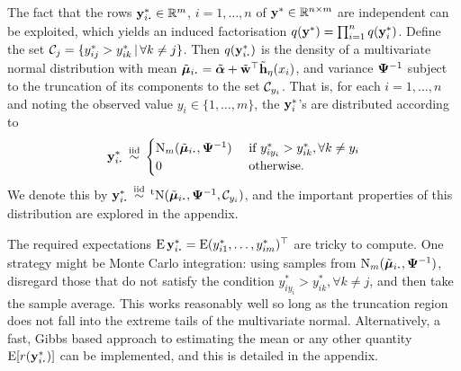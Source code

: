 The fact that the rows $\by_{i \bigcdot}^* \in \bbR^m$, $i=1,\dots,n$ of ${\mathbf y}^* \in \mathbb{R}^{n \times m}$ are independent can be exploited, which yields an induced factorisation $q({\mathbf y}^*) = \prod_{i=1}^n q({\mathbf y}_i^*)$.
Define the set ${\mathcal C}_j = \{y_{ij}^* > y_{ik}^* \,|\, \forall k\neq j \}$.
Then $q(\by_{i \bigcdot}^*)$ is the density of a multivariate normal distribution with mean $\tilde\bmu_{i \bigcdot} = \tilde\balpha + \tilde\bw^\top \tilde \bh_\eta(x_i)$, and variance ${\bm\Psi}^{-1}$ subject to the truncation of its components to the set ${\mathcal C}_{y_i}$.
That is, for each $i=1,\dots,n$ and noting the observed value $y_i \in \{1,\dots,m\}$, the ${\mathbf y}_i^*$'s are distributed according to
\begin{align}\label{eq:ystardist}
  \by_{i \bigcdot}^* \iid
  \begin{cases}
    \N_m(\tilde\bmu_{i \bigcdot},  \bPsi^{-1}) & \text{ if } y_{iy_i}^* > y_{ik}^*, \forall k \neq y_i \\
    0 & \text{ otherwise}. \\
  \end{cases}
\end{align}
We denote this by $\by_{i \bigcdot}^* \iid \tN(\tilde\bmu_{i \bigcdot}, \bPsi^{-1},\cC_{y_i})$, and the important properties of this distribution are explored in the appendix.

The required expectations $\E\by_{i \bigcdot}^* = \E (y_{i1}^*,\dots,y_{im}^*)^\top$ are tricky to compute.
One strategy might be Monte Carlo integration: using samples from $\N_m(\tilde\bmu_{i \bigcdot},  \bPsi^{-1})$, disregard those that do not satisfy the condition $y_{iy_i}^* > y_{ik}^*, \forall k \neq j$, and then take the sample average.
This works reasonably well so long as the truncation region does not fall into the extreme tails of the multivariate normal.
Alternatively, a fast, Gibbs based approach to estimating the mean or any other quantity $\E [r(\by_{i \bigcdot}^*)]$ can be implemented, and this is detailed in the appendix.

